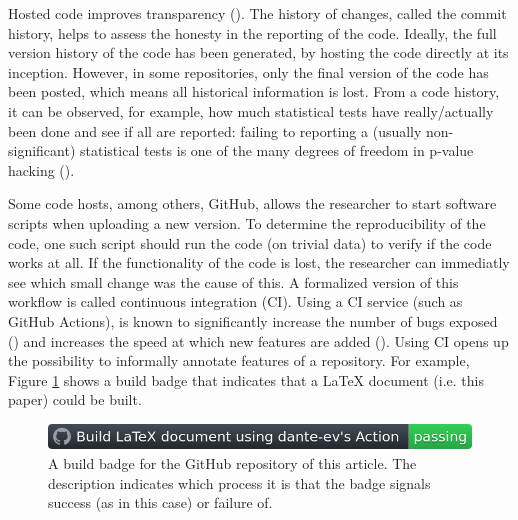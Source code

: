 Hosted code improves transparency (\cite{gorgolewski2016practical}).
The history of changes, called the commit history, 
helps to assess the honesty in the reporting of the code. 
Ideally, the full version history of the code 
has been generated, by hosting the code directly at its inception.
However, in some repositories, only the final version of the code has been
posted, which means all historical information is lost.
From a code history, it can be observed, for example, 
how much statistical tests have really/actually been done 
and see if all are reported:
failing to reporting a (usually non-significant) statistical tests is 
one of the many degrees of freedom 
in p-value hacking (\cite{wicherts2016degrees}).


Some code hosts, among others, GitHub, 
allows the researcher to start software scripts when uploading a new version.
To determine the reproducibility of the code, one such script should
run the code (on trivial data) to verify if the code works at all.
If the functionality of the code is lost, the researcher
can immediatly see which small change was the cause of this.
A formalized version of this workflow is called continuous integration (CI).
Using a CI service (such as GitHub Actions), is known to significantly 
increase the number of bugs exposed (\cite{vasilescu2015}) and increases
the speed at which new features are added (\cite{vasilescu2015}).
Using CI opens up the possibility to informally annotate features of
a repository. For example, Figure \ref{fig:build_badge} shows a 
build badge that indicates that a LaTeX document (i.e. this paper)
could be built.

\begin{figure}[!htbp]
  \centering
  \includegraphics[width=\linewidth]{build_badge.png}
  \caption{
    A build badge for the GitHub repository of this article.
    The description indicates which process it is that the badge
    signals success (as in this case) or failure of. 
  }
  \label{fig:build_badge}
\end{figure}


